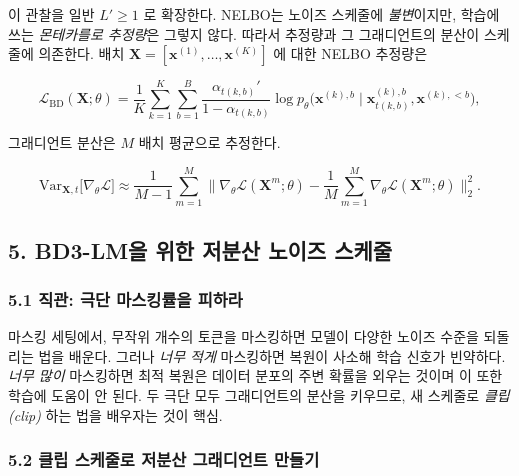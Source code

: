 \documentclass[
]{article}
\begin{document}
이 관찰을 일반 \(L' \ge 1\) 로 확장한다. NELBO는 노이즈 스케줄에
\emph{불변}이지만, 학습에 쓰는 \emph{몬테카를로 추정량}은 그렇지 않다.
따라서 추정량과 그 그래디언트의 분산이 스케줄에 의존한다. 배치
\(\mathbf{X} = [\mathbf{x}^{(1)}, \dots, \mathbf{x}^{(K)}]\) 에 대한
NELBO 추정량은

\[
\mathcal{L}_\text{BD}(\mathbf{X}; \theta) = \frac{1}{K} \sum_{k=1}^{K} \sum_{b=1}^{B} \frac{\alpha_{t(k,b)}'}{1-\alpha_{t(k,b)}} \log p_\theta\!\big(\mathbf{x}^{(k),b} \mid \mathbf{x}^{(k),b}_{t(k,b)}, \mathbf{x}^{(k), < b}\big),
\]

그래디언트 분산은 \(M\) 배치 평균으로 추정한다.

\[
\text{Var}_{\mathbf{X}, t}\!\big[\nabla_\theta \mathcal{L}\big] \approx \frac{1}{M-1} \sum_{m=1}^{M} \Big\| \nabla_\theta \mathcal{L}(\mathbf{X}^m; \theta) - \frac{1}{M} \sum_{m=1}^{M} \nabla_\theta \mathcal{L}(\mathbf{X}^m; \theta) \Big\|_2^2.
\]

\hypertarget{bd3-lmuxc744-uxc704uxd55c-uxc800uxbd84uxc0b0-uxb178uxc774uxc988-uxc2a4uxcf00uxc904}{%
\subsection{5. BD3-LM을 위한 저분산 노이즈
스케줄}\label{bd3-lmuxc744-uxc704uxd55c-uxc800uxbd84uxc0b0-uxb178uxc774uxc988-uxc2a4uxcf00uxc904}}

\hypertarget{uxc9c1uxad00-uxadf9uxb2e8-uxb9c8uxc2a4uxd0b9uxb960uxc744-uxd53cuxd558uxb77c}{%
\subsubsection{5.1 직관: 극단 마스킹률을
피하라}\label{uxc9c1uxad00-uxadf9uxb2e8-uxb9c8uxc2a4uxd0b9uxb960uxc744-uxd53cuxd558uxb77c}}

마스킹 세팅에서, 무작위 개수의 토큰을 마스킹하면 모델이 다양한 노이즈
수준을 되돌리는 법을 배운다. 그러나 \emph{너무 적게} 마스킹하면 복원이
사소해 학습 신호가 빈약하다. \emph{너무 많이} 마스킹하면 최적 복원은
데이터 분포의 주변 확률을 외우는 것이며 이 또한 학습에 도움이 안 된다.
두 극단 모두 그래디언트의 분산을 키우므로, 새 스케줄로 \emph{클립(clip)}
하는 법을 배우자는 것이 핵심.

\hypertarget{uxd074uxb9bd-uxc2a4uxcf00uxc904uxb85c-uxc800uxbd84uxc0b0-uxadf8uxb798uxb514uxc5b8uxd2b8-uxb9ccuxb4e4uxae30}{%
\subsubsection{5.2 클립 스케줄로 저분산 그래디언트
만들기}\label{uxd074uxb9bd-uxc2a4uxcf00uxc904uxb85c-uxc800uxbd84uxc0b0-uxadf8uxb798uxb514uxc5b8uxd2b8-uxb9ccuxb4e4uxae30}}
\end{document}
